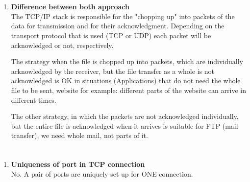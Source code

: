 \documentclass[12pt]{article}
\begin{document}
    \section{}
    \begin{enumerate}[label=(\alph*)]

    \item \textbf{Difference between both approach} \\
    The TCP/IP stack is responsible for the "chopping up" into packets of the data for transmission and for their acknowledgment. Depending on the transport protocol that is used (TCP or UDP) each packet will be acknowledged or not, respectively.
    
    The strategy when the file is chopped up into packets, which are individually acknowledged by the receiver, but the file transfer as a whole is not acknowledged is OK in situations (Applications) that do not need the whole file to be sent, website for example: different parts of the website can arrive in different times.
    
    The other strategy, in which the packets are not acknowledged individually, but the entire file is acknowledged when it arrives is suitable for FTP (mail transfer), we need whole mail, not parts of it.

    \end{enumerate}
    
    \section{}
    \begin{enumerate}[label=(\alph*)]

    \item \textbf{Uniqueness of port in TCP connection} \\
    No. A pair of ports are uniquely set up for ONE connection.
    \end{enumerate}
    
\end{document}

